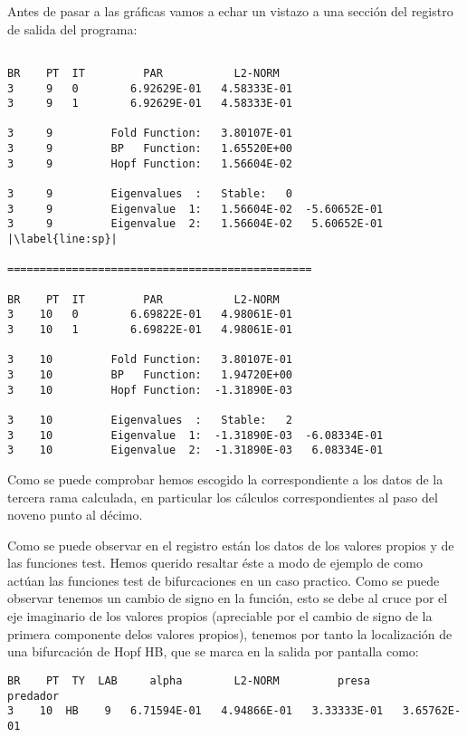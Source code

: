 Antes de pasar a las gráficas vamos a echar un vistazo a una sección del registro de salida del programa:
\begin{lstlisting}[escapechar=|]

BR    PT  IT         PAR           L2-NORM
3     9   0        6.92629E-01   4.58333E-01
3     9   1        6.92629E-01   4.58333E-01

3     9         Fold Function:   3.80107E-01
3     9         BP   Function:   1.65520E+00
3     9         Hopf Function:   1.56604E-02

3     9         Eigenvalues  :   Stable:   0
3     9         Eigenvalue  1:   1.56604E-02  -5.60652E-01
3     9         Eigenvalue  2:   1.56604E-02   5.60652E-01 |\label{line:sp}|

===============================================

BR    PT  IT         PAR           L2-NORM
3    10   0        6.69822E-01   4.98061E-01
3    10   1        6.69822E-01   4.98061E-01

3    10         Fold Function:   3.80107E-01
3    10         BP   Function:   1.94720E+00
3    10         Hopf Function:  -1.31890E-03

3    10         Eigenvalues  :   Stable:   2
3    10         Eigenvalue  1:  -1.31890E-03  -6.08334E-01
3    10         Eigenvalue  2:  -1.31890E-03   6.08334E-01

\end{lstlisting}

Como se puede comprobar hemos escogido la correspondiente a los datos de la tercera rama calculada, en particular los cálculos correspondientes al paso del noveno punto al décimo.

 Como se puede observar en el registro están los datos de los valores propios y de las funciones test. Hemos querido resaltar éste a modo de ejemplo de como actúan las funciones test de bifurcaciones en un caso practico. Como se puede observar tenemos un cambio de signo en la función, esto se debe al cruce por el eje imaginario de los valores propios (apreciable por el cambio de signo de la primera componente delos valores propios), tenemos por tanto la localización de una bifurcación de Hopf HB, que se marca en la salida por pantalla como:
 \begin{lstlisting}
BR    PT  TY  LAB     alpha        L2-NORM         presa        predador    
3    10  HB    9   6.71594E-01   4.94866E-01   3.33333E-01   3.65762E-01
 \end{lstlisting}


